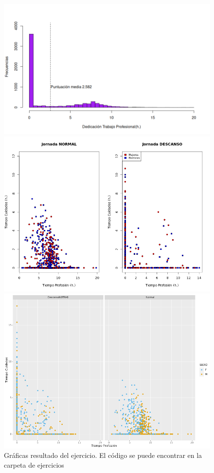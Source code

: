 \sol 
\begin{figure}[H]
    \centering
    \includegraphics[width=0.6\linewidth]{EAD/images/Ejercicio_T1_E01_01.png}
    \vspace{0.5cm}
    \begin{minipage}{0.49\textwidth}
        \centering
        \includegraphics[width=0.7\linewidth]{EAD/images/Ejercicio_T1_E01_02.png}
    \end{minipage}
    \hfill
    \begin{minipage}{0.49\textwidth}
        \centering
        \includegraphics[width=0.7\linewidth]{EAD/images/Ejercicio_T1_E01_03.png}
    \end{minipage}
    
    \caption{Gráficas resultado del ejercicio. El código se puede encontrar en la carpeta de ejercicios}
\end{figure}



